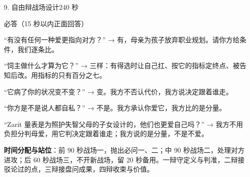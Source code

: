 \documentclass[script,con]{debate}
\begin{document}
\begin{stage}{9. 自由辩战场设计}{240 秒}
\begin{points}{必答（15 秒以内正面回答）}
\item “有没有任何一种爱更指向对方？” → 有，母亲为孩子放弃职业规划。请你方给条件，我们逐条比。
\item “饲主做什么才算为它？” → 三样：有得选时让自己扛、按它的指标定终点、被告知后改。用指标的只有百分之七。
\item “它病了你的状况变不变？” → 变。我方不否认代价，我方说决定跟着谁走。
\item “你方是不是说人都自私？” → 不是。我方承认你爱它，我方比的是分量。
\item “Zarit 量表是为照护失智父母的子女设计的，他们也更爱自己吗？” → 我方不用负担分判母爱，用它判决定跟着谁走；我方说的是分量，不是不爱。
\end{points}
\textbf{时间分配与站位}：前 90 秒战场一，抛出必问一、二；中 90 秒战场二，处理对方进攻；后 60 秒战场三，不开新战场，留 20 秒备用。一辩守定义与判准，二辩接驳论过的点，三辩接盘问成果，四辩收束与价值。
\end{stage}
\end{document}
